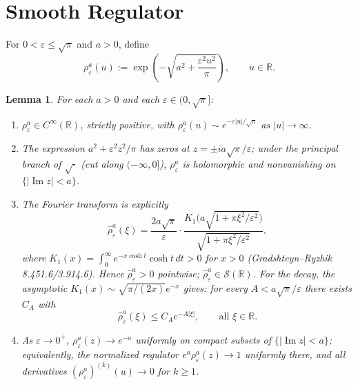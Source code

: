 \documentclass[12pt]{amsart}
\newtheorem{lemma}[theorem]{Lemma}
\theoremstyle{remark}
\begin{document}
\section{Smooth Regulator}\label{sec:regulator}

For $0<\varepsilon\leq\sqrt{\pi}$ and $a>0$, define
\begin{equation}\label{eq:regulator}
  \rho_\varepsilon^a(u)
  := \exp\!\left(-\sqrt{a^2+\frac{\varepsilon^2 u^2}{\pi}}\right),
  \qquad u\in\mathbb{R}.
\end{equation}

\begin{lemma}\label{lem:reg}
For each $a>0$ and each $\varepsilon\in(0,\sqrt{\pi}]$:
\begin{enumerate}
\item\label{lem:smooth} $\rho_\varepsilon^a\in C^\infty(\mathbb{R})$, strictly positive,
  with $\rho_\varepsilon^a(u)\sim e^{-\varepsilon|u|/\sqrt{\pi}}$ as $|u|\to\infty$.
\item\label{lem:holo} The expression $a^2+\varepsilon^2 z^2/\pi$ has zeros at
  $z=\pm ia\sqrt{\pi}/\varepsilon$; under the principal branch of $\sqrt{\cdot}$
  (cut along $(-\infty,0]$), $\rho_\varepsilon^a$ is holomorphic and
  nonvanishing on $\{|\operatorname{Im}z|<a\}$.
\item\label{lem:ftpos} The Fourier transform is explicitly
  \begin{equation}\label{eq:Kone}
    \hat\rho_\varepsilon^a(\xi)
    = \frac{2a\sqrt{\pi}}{\varepsilon}
      \cdot\frac{K_1\!\bigl(a\sqrt{1+\pi\xi^2/\varepsilon^2}\bigr)}
               {\sqrt{1+\pi\xi^2/\varepsilon^2}},
  \end{equation}
  where $K_1(x)=\int_0^\infty e^{-x\cosh t}\cosh t\,dt>0$ for
  $x>0$ (Gradshteyn--Ryzhik 8.451.6/3.914.6).
  Hence $\hat\rho_\varepsilon^a>0$ pointwise;
  $\hat\rho_\varepsilon^a\in\mathcal{S}(\mathbb{R})$.  For the decay,
  the asymptotic $K_1(x)\sim\sqrt{\pi/(2x)}e^{-x}$ gives: for every
  $A<a\sqrt{\pi}/\varepsilon$ there exists $C_A$ with
  \begin{equation}\label{eq:decay}
    \hat\rho_\varepsilon^a(\xi)\leq C_A e^{-A|\xi|},
    \qquad\text{all }\xi\in\mathbb{R}.
  \end{equation}
\item\label{lem:limit} As $\varepsilon\to 0^+$, $\rho_\varepsilon^a(z)\to e^{-a}$ uniformly on
  compact subsets of $\{|\operatorname{Im}z|<a\}$; equivalently, the
  normalized regulator $e^a\rho_\varepsilon^a(z)\to 1$ uniformly there,
  and all derivatives $(\rho_\varepsilon^a)^{(k)}(u)\to 0$ for $k\geq 1$.
\end{enumerate}
\end{lemma}
\end{document}
